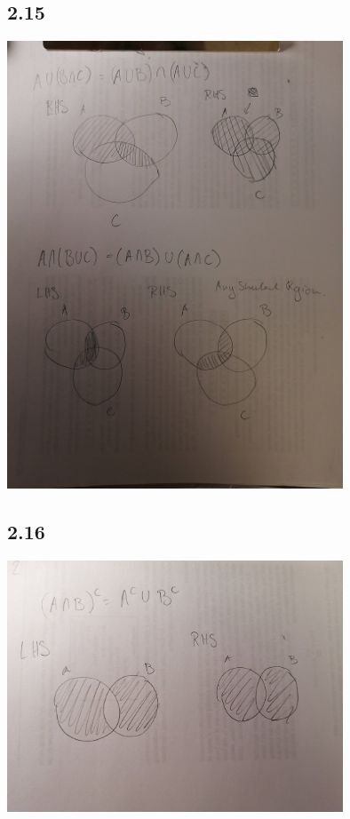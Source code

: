 \documentclass[11pt]{book}
\begin{document}

\subsection{2.15}%
\label{sub:2_15}

\begin{center}
    \includegraphics[width=100mm]{assets/sug-dist.jpg} 
\end{center}


\subsection{2.16}%
\label{sub:2_16}

\begin{center}
    \includegraphics[width=100mm]{assets/sug-morg.jpg} 
\end{center}



\end{document}
